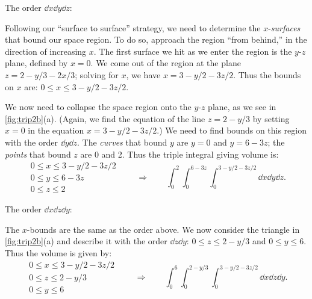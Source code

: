 \begin{example}
\noindent The order $\dd x\dd y\dd z$:\bigskip

Following our ``surface to surface\dotso'' strategy, we need to determine the $x$-\emph{surfaces} that bound our space region. To do so, approach the region ``from behind,'' in the direction of increasing $x$. The first surface we hit as we enter the region is the $y$-$z$ plane, defined by $x=0$. We come out of the region at the plane $z=2-y/3-2x/3$; solving for $x$, we have $x= 3-y/2-3z/2$. Thus the bounds on $x$ are: $0\leq x\leq 3-y/2-3z/2$.

We now need to collapse the space region onto the $y$-$z$ plane, as we see in \autoref{fig:trip2b}(a). (Again, we find the equation of the line $z=2-y/3$ by setting $x=0$ in the equation $x=3-y/2-3z/2$.) We need to find bounds on this region with the order $\dd y\dd z$. The \emph{curves} that bound $y$ are $y=0$ and $y=6-3z$; the \emph{points} that bound $z$ are 0 and 2. Thus the triple integral giving volume is:
\[
 \begin{gathered}
  0\leq x\leq 3-y/2-3z/2\\
  0\leq y\leq 6-3z\\
  0\leq z\leq 2
 \end{gathered}
 \qquad\Rightarrow\qquad
 \int_0^2\int_0^{6-3z}\int_0^{3-y/2-3z/2}\dd x\dd y\dd z.
\]


\noindent The order $\dd x\dd z\dd y$:\bigskip

The $x$-bounds are the same as the order above. We now consider the triangle in \autoref{fig:trip2b}(a) and describe it with the order $\dd z\dd y$: $0\leq z\leq 2-y/3$ and $0\leq y\leq 6$. Thus the volume is given by:
\[
 \begin{gathered}
  0\leq x\leq 3-y/2-3z/2\\
  0\leq z\leq 2-y/3\\
  0\leq y\leq 6
 \end{gathered}
 \qquad\Rightarrow\qquad
 \int_0^6\int_0^{2-y/3}\int_0^{3-y/2-3z/2}\dd x\dd z\dd y.
\]


\end{example}
